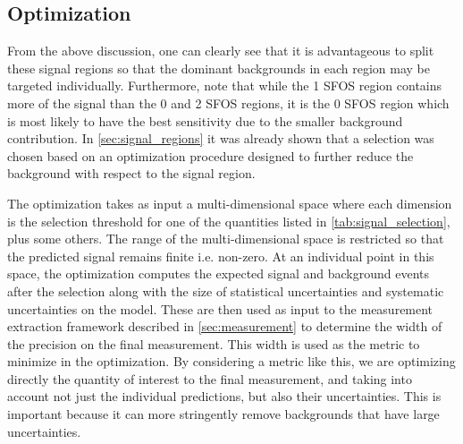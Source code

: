 \subsection{Optimization}
\label{sec:optimization}
From the above discussion, one can clearly see that it is
advantageous to split these signal regions so that the dominant
backgrounds in each region may be targeted individually.  Furthermore,
note that while the 1 SFOS region contains more of the signal than the
0 and 2 SFOS regions, it is the 0 SFOS region which is most likely to
have the best sensitivity due to the smaller background contribution.
In \sec\ref{sec:signal_regions} it was already shown
that a selection was chosen based on an optimization procedure
designed to further reduce the background with respect to the 
signal region. 

The optimization takes as input a multi-dimensional 
space where each dimension is the selection threshold
for one of the quantities listed in \tab\ref{tab:signal_selection}, 
plus some others.
The range of the multi-dimensional space 
is restricted so that the 
predicted signal remains finite i.e. non-zero.
At an individual point in this space, the optimization computes
the expected signal and background events after the selection
along with the size of statistical uncertainties
and systematic uncertainties on the model. 
These are then used as input to the measurement extraction framework
described in \sec\ref{sec:measurement} to determine the width of the precision
on the final measurement. 
This width is used as the metric to minimize in the optimization.
By considering a metric like this, we are optimizing directly
the quantity of interest to the final measurement, and taking
into account not just the individual predictions, but also their
uncertainties. This is important because it can more stringently
remove backgrounds that have large uncertainties.

